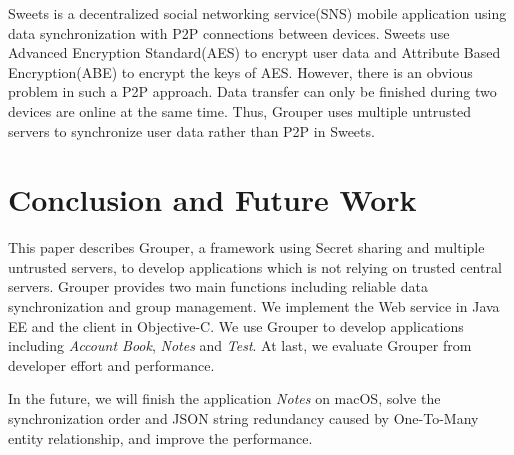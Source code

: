 \documentclass[twocolumn,10pt]{article}
\begin{document}
Sweets\cite{sweets} is a decentralized social networking service(SNS) mobile application using data synchronization with P2P connections between devices. Sweets use Advanced Encryption Standard(AES) to encrypt user data and Attribute Based Encryption(ABE) to encrypt the keys of AES. However, there is an obvious problem in such a P2P approach. Data transfer can only be finished during two devices are online at the same time. Thus, Grouper uses multiple untrusted servers to synchronize user data rather than P2P in Sweets.

\section{Conclusion and Future Work}

This paper describes Grouper, a framework using Secret sharing and multiple untrusted servers, to develop applications which is not relying on trusted central servers. Grouper provides two main functions including reliable data synchronization and group management. We implement the Web service in Java EE and the client in Objective-C. We use Grouper to develop applications including \emph{Account Book}, \emph{Notes} and \emph{Test}. At last, we evaluate Grouper from developer effort and performance. 

In the future, we will finish the application \emph{Notes} on macOS, solve the synchronization order and JSON string redundancy caused by One-To-Many entity relationship, and improve the performance.


{
	\footnotesize
	
}
\end{document}
